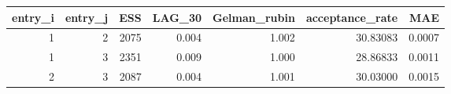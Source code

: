 \begin{longtable}{rrrrrrr}
\toprule
entry\_i & entry\_j & ESS & LAG\_30 & Gelman\_rubin & acceptance\_rate & MAE \\ 
\midrule
1 & 2 & 2075 & 0.004 & 1.002 & 30.83083 & 0.0007 \\ 
1 & 3 & 2351 & 0.009 & 1.000 & 28.86833 & 0.0011 \\ 
2 & 3 & 2087 & 0.004 & 1.001 & 30.03000 & 0.0015 \\ 
\bottomrule
\end{longtable}

